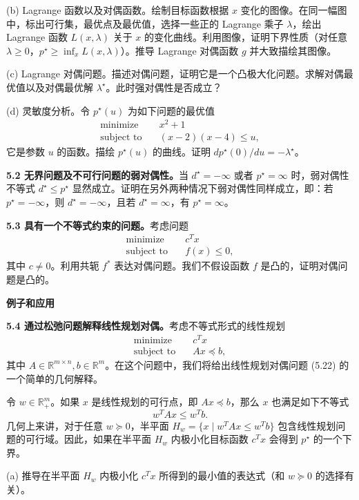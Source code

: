 \documentclass[UTF8, 12pt, fontset=fandol, oneside]{ctexart}
\begin{document}
(b) Lagrange 函数以及对偶函数。绘制目标函数根据 $x$ 变化的图像。在同一幅图中，标出可行集，最优点及最优值，选择一些正的 Lagrange 乘子 $\lambda$，绘出 Lagrange 函数 $L(x,\lambda)$ 关于 $x$ 的变化曲线。利用图像，证明下界性质（对任意 $\lambda\geq 0$，$p^\star\geq\inf_x L(x,\lambda)$）。推导 Lagrange 对偶函数 $g$ 并大致描绘其图像。

(c) Lagrange 对偶问题。描述对偶问题，证明它是一个凸极大化问题。求解对偶最优值以及对偶最优解 $\lambda^\star$。此时强对偶性是否成立？

(d) 灵敏度分析。令 $p^\star(u)$ 为如下问题的最优值
\[
\begin{aligned}
\text{minimize}\quad & x^2+1\\
\text{subject to}\quad & (x-2)(x-4)\leq u,
\end{aligned}
\]
它是参数 $u$ 的函数。描绘 $p^\star(u)$ 的曲线。证明 $dp^\star(0)/du=-\lambda^\star$。

\noindent\textbf{5.2 无界问题及不可行问题的弱对偶性。}\quad 当 $d^\star=-\infty$ 或者 $p^\star=\infty$ 时，弱对偶性不等式 $d^\star\leq p^\star$ 显然成立。证明在另外两种情况下弱对偶性同样成立，即：若 $p^\star=-\infty$，则 $d^\star=-\infty$，且若 $d^\star=\infty$，有 $p^\star=\infty$。

\noindent\textbf{5.3 具有一个不等式约束的问题。}\quad 考虑问题
\[
\begin{aligned}
\text{minimize}\quad & c^Tx\\
\text{subject to}\quad & f(x)\leq 0,
\end{aligned}
\]
其中 $c\neq 0$。利用共轭 $f^\ast$ 表达对偶问题。我们不假设函数 $f$ 是凸的，证明对偶问题是凸的。

\noindent\textbf{例子和应用}

\noindent\textbf{5.4 通过松弛问题解释线性规划对偶。}\quad 考虑不等式形式的线性规划
\[
\begin{aligned}
\text{minimize}\quad & c^Tx\\
\text{subject to}\quad & Ax\preceq b,
\end{aligned}
\]
其中 $A\in\mathbb{R}^{m\times n}, b\in\mathbb{R}^m$。在这个问题中，我们将给出线性规划对偶问题 (5.22) 的一个简单的几何解释。

令 $w\in\mathbb{R}_+^m$。如果 $x$ 是线性规划的可行点，即 $Ax\preceq b$，那么 $x$ 也满足如下不等式
\[
w^TAx\leq w^Tb.
\]
几何上来讲，对于任意 $w\succeq 0$，半平面 $H_w=\{x\mid w^TAx\leq w^Tb\}$ 包含线性规划问题的可行域。因此，如果在半平面 $H_w$ 内极小化目标函数 $c^Tx$ 会得到 $p^\star$ 的一个下界。

(a) 推导在半平面 $H_w$ 内极小化 $c^Tx$ 所得到的最小值的表达式（和 $w\succeq 0$ 的选择有关）。
\end{document}

